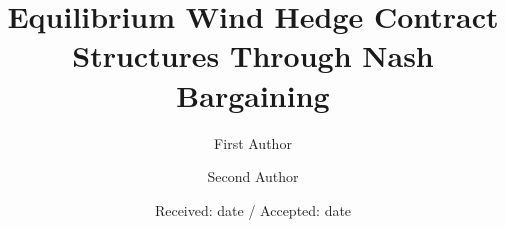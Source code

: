 \newcommand{\supe}{\mathop{\hbox{\rm sup}}}
\newcommand{\maximize}[1]{\displaystyle\maxim_{#1}}
\newcommand{\maxim}{\mathop{\hbox{\rm maximize}}}
\newcommand{\maximi}[1]{\displaystyle\maxi_{#1}}
\newcommand{\maxi}{\mathop{\hbox{\rm max}}}
\newcommand{\minimize}[1]{\displaystyle\minim_{#1}}
\newcommand{\minim}{\mathop{\hbox{\rm minimize}}}
\newcommand{\minimi}[1]{\displaystyle\mini_{#1}}
\newcommand{\mini}{\mathop{\hbox{\rm min}}}
\newcommand{\amin}{\mathop{\mbox{argmin}}}
\newcommand{\amax}{\mathop{\mbox{argmax}}}
\newcommand{\st}{\mathrm{subject\ to}}
\newcommand{\Cal}{\mathcal}
\newcommand{\norm}[1]{\left\Vert#1\right\Vert}
\newcommand{\abs}[1]{\left\vert#1\right\vert}
\newcommand{\set}[1]{\left\{#1\right\}}
\newcommand{\Real}{\mathbb R}
\newcommand{\where}{\mathrm{where}}
\newcommand{\Hif}{{H}_{i, f}}
\newcommand{\N}{\mathcal{N}}
\newcommand{\J}{\mathcal{J}}
\newcommand{\E}{\mathbb{E}}
\newcommand{\D}{\mathbb{D}}
\newcommand{\free}{\mathrm{free}}
\newcommand{\1}{\mathbf{1}}
\newcommand{\indicator}[1]{\mathbbm{1}_{\left[ {#1} \right] }}      
\newcommand{\dps}{\displaystyle}
\newcommand{\ubar}[1]{\text{\b{$#1$}}}



\title{Equilibrium Wind Hedge Contract Structures Through Nash Bargaining%
}


\author{First Author         \and
        Second Author %
}



\date{Received: date / Accepted: date}


\maketitle

